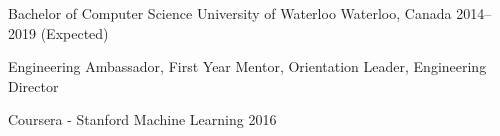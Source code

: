 \begin{cventries}
  \cventry
    {Bachelor of Computer Science}
    {University of Waterloo}
    {Waterloo, Canada}
    {2014–2019 (Expected)}
    {
      \begin{cvitems}
        \item {Engineering Ambassador, First Year Mentor, Orientation Leader, Engineering Director}
      \end{cvitems}
    }
  \cventryalt
    {Coursera - Stanford Machine Learning}
    {}
    {}
    {2016}
    {}
\end{cventries}
